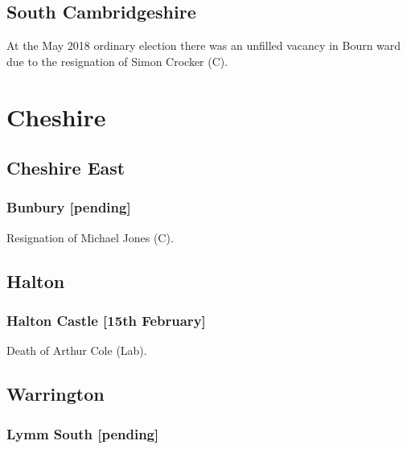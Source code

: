 \documentclass[a4paper,openany]{book}
\begin{document}
\begin{resultsiii}
\subsection*{South Cambridgeshire}

At the May 2018 ordinary election there was an unfilled vacancy in Bourn ward due to the resignation of Simon Crocker (C).

\section{Cheshire}

\subsection*{Cheshire East}

\subsubsection*{Bunbury \hspace*{\fill}\nolinebreak[1]%
\enspace\hspace*{\fill}
[pending]}


Resignation of Michael Jones (C).

\subsection*{Halton}

\subsubsection*{Halton Castle \hspace*{\fill}\nolinebreak[1]%
\enspace\hspace*{\fill}
[15th February]}


Death of Arthur Cole (Lab).

\subsection*{Warrington}

\subsubsection*{Lymm South \hspace*{\fill}\nolinebreak[1]%
\enspace\hspace*{\fill}
[pending]}


\end{resultsiii}
\end{document}
